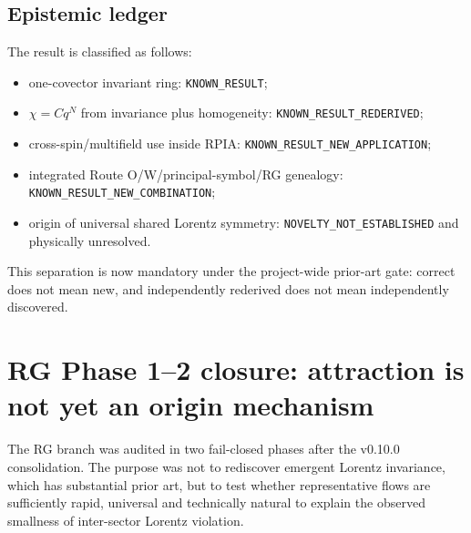 \documentclass[11pt,a4paper]{article}
\begin{document}
\subsection{Epistemic ledger}
The result is classified as follows:
\begin{itemize}
\item one-covector invariant ring: \texttt{KNOWN\_RESULT};
\item $\chi=Cq^N$ from invariance plus homogeneity: \texttt{KNOWN\_RESULT\_REDERIVED};
\item cross-spin/multifield use inside RPIA: \texttt{KNOWN\_RESULT\_NEW\_APPLICATION};
\item integrated Route O/W/principal-symbol/RG genealogy: \texttt{KNOWN\_RESULT\_NEW\_COMBINATION};
\item origin of universal shared Lorentz symmetry: \texttt{NOVELTY\_NOT\_ESTABLISHED} and physically unresolved.
\end{itemize}
This separation is now mandatory under the project-wide prior-art gate: correct does not mean new, and independently rederived does not mean independently discovered.



\section{RG Phase 1--2 closure: attraction is not yet an origin mechanism}
\label{sec:rg-phase12}
The RG branch was audited in two fail-closed phases after the v0.10.0 consolidation.  The purpose was not to rediscover emergent Lorentz invariance, which has substantial prior art, but to test whether representative flows are sufficiently rapid, universal and technically natural to explain the observed smallness of inter-sector Lorentz violation.
\end{document}
